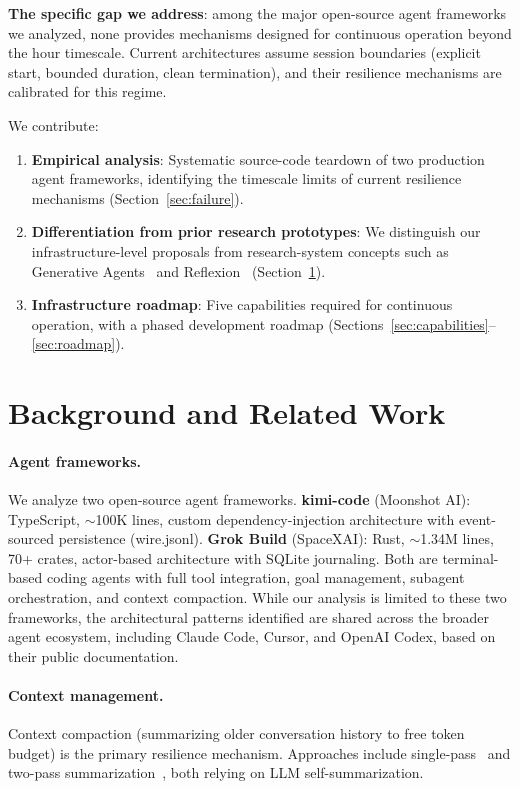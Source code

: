 \documentclass{article}
\begin{document}
\textbf{The specific gap we address}: among the major open-source agent frameworks we analyzed, none provides mechanisms designed for continuous operation beyond the hour timescale. Current architectures assume session boundaries (explicit start, bounded duration, clean termination), and their resilience mechanisms are calibrated for this regime.

We contribute:
\begin{enumerate}[leftmargin=*,itemsep=2pt]
\item \textbf{Empirical analysis}: Systematic source-code teardown of two production agent frameworks, identifying the timescale limits of current resilience mechanisms (Section~\ref{sec:failure}).
\item \textbf{Differentiation from prior research prototypes}: We distinguish our infrastructure-level proposals from research-system concepts such as Generative Agents~\cite{park2023generative} and Reflexion~\cite{shinn2023reflexion} (Section~\ref{sec:related}).
\item \textbf{Infrastructure roadmap}: Five capabilities required for continuous operation, with a phased development roadmap (Sections~\ref{sec:capabilities}--\ref{sec:roadmap}).
\end{enumerate}

\section{Background and Related Work}
\label{sec:related}

\paragraph{Agent frameworks.}
We analyze two open-source agent frameworks. \textbf{kimi-code} (Moonshot AI): TypeScript, ${\sim}$100K lines, custom dependency-injection architecture with event-sourced persistence (wire.jsonl). \textbf{Grok Build} (SpaceXAI): Rust, ${\sim}$1.34M lines, 70+ crates, actor-based architecture with SQLite journaling. Both are terminal-based coding agents with full tool integration, goal management, subagent orchestration, and context compaction. While our analysis is limited to these two frameworks, the architectural patterns identified are shared across the broader agent ecosystem, including Claude Code, Cursor, and OpenAI Codex, based on their public documentation.

\paragraph{Context management.}
Context compaction (summarizing older conversation history to free token budget) is the primary resilience mechanism. Approaches include single-pass~\cite{kimicode} and two-pass summarization~\cite{grokbuild}, both relying on LLM self-summarization.
\end{document}
